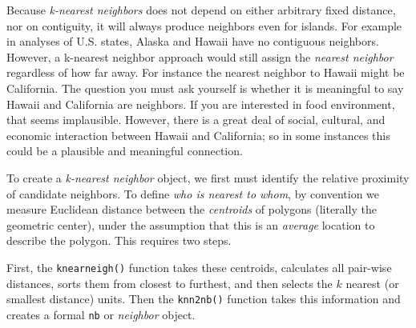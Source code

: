 \documentclass[
]{book}
\newenvironment{Shaded}{\begin{snugshade}}{\end{snugshade}}
\newcommand{\AttributeTok}[1]{\textcolor[rgb]{0.13,0.29,0.53}{#1}}
\newcommand{\CommentTok}[1]{\textcolor[rgb]{0.56,0.35,0.01}{\textit{#1}}}
\newcommand{\DecValTok}[1]{\textcolor[rgb]{0.00,0.00,0.81}{#1}}
\newcommand{\FunctionTok}[1]{\textcolor[rgb]{0.13,0.29,0.53}{\textbf{#1}}}
\newcommand{\NormalTok}[1]{#1}
\newcommand{\OtherTok}[1]{\textcolor[rgb]{0.56,0.35,0.01}{#1}}
\newcommand{\SpecialCharTok}[1]{\textcolor[rgb]{0.81,0.36,0.00}{\textbf{#1}}}
\newenvironment{rmdnote}[1]
  {
  \begin{itemize}
  \renewcommand{\labelitemi}{
    \raisebox{-.7\height}[0pt][0pt]{
      {\setkeys{Gin}{width=3em,keepaspectratio}\texttt{[image: images/\#1]}}
    }
  }
  \setlength{\fboxsep}{1em}
  \begin{note}
  \item
  }
  {
  \end{note}
  \end{itemize}
  }
\begin{document}
\begin{rmdnote}{note}
Because \emph{k-nearest neighbors} does not depend on either arbitrary fixed distance, nor on contiguity, it will always produce neighbors even for islands. For example in analyses of U.S. states, Alaska and Hawaii have no contiguous neighbors. However, a k-nearest neighbor approach would still assign the \emph{nearest neighbor} regardless of how far away. For instance the nearest neighbor to Hawaii might be California. The question you must ask yourself is whether it is meaningful to say Hawaii and California are neighbors. If you are interested in food environment, that seems implausible. However, there is a great deal of social, cultural, and economic interaction between Hawaii and California; so in some instances this could be a plausible and meaningful connection.

\end{rmdnote}

To create a \emph{k-nearest neighbor} object, we first must identify the relative proximity of candidate neighbors. To define \emph{who is nearest to whom}, by convention we measure Euclidean distance between the \emph{centroids} of polygons (literally the geometric center), under the assumption that this is an \emph{average} location to describe the polygon. This requires two steps.

First, the \texttt{knearneigh()} function takes these centroids, calculates all pair-wise distances, sorts them from closest to furthest, and then selects the \(k\) nearest (or smallest distance) units. Then the \texttt{knn2nb()} function takes this information and creates a formal \texttt{nb} or \emph{neighbor} object.

\begin{Shaded}
\end{Shaded}
\end{document}
